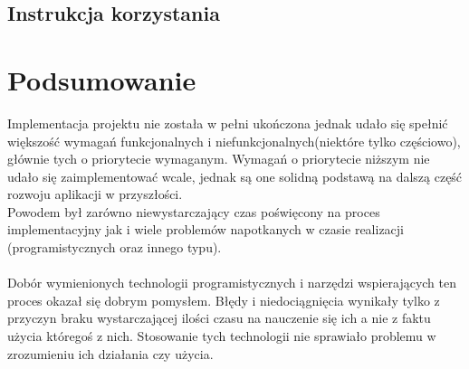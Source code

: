 \documentclass[eng,printmode]{mgr}
\begin{document}
\section{Instrukcja korzystania}
\chapter{Podsumowanie}
Implementacja projektu nie została w pełni ukończona jednak udało się spełnić większość wymagań funkcjonalnych i niefunkcjonalnych(niektóre tylko częściowo), głównie tych o priorytecie wymaganym. Wymagań o priorytecie niższym nie udało się zaimplementować wcale, jednak są one solidną podstawą na dalszą część rozwoju aplikacji w przyszłości.
\\
Powodem był zarówno niewystarczający czas poświęcony na proces implementacyjny jak i wiele problemów napotkanych w czasie realizacji (programistycznych oraz innego typu).
\\
\\
Dobór wymienionych technologii programistycznych i narzędzi wspierających ten proces okazał się dobrym pomysłem. Błędy i niedociągnięcia wynikały tylko z przyczyn braku wystarczającej ilości czasu na nauczenie się ich a nie z faktu użycia któregoś z nich. Stosowanie tych technologii nie sprawiało problemu w zrozumieniu ich działania czy użycia.
\end{document}
